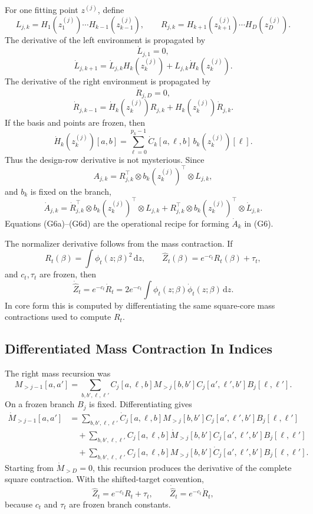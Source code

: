 \documentclass[11pt]{article}
\newcommand{\dd}{\,\mathrm d}
\begin{document}
For one fitting point \(z^{(j)}\), define
\[
    L_{j,k}=H_1(z_1^{(j)})\cdots H_{k-1}(z_{k-1}^{(j)}),
    \qquad
    R_{j,k}=H_{k+1}(z_{k+1}^{(j)})\cdots H_D(z_D^{(j)}).
\]
The derivative of the left environment is propagated by
\[
    \dot L_{j,1}=0,
\]
\[
    \dot L_{j,k+1}
    =
    \dot L_{j,k}H_k(z_k^{(j)})
    +
    L_{j,k}\dot H_k(z_k^{(j)}).
    \tag{G6a}
\]
The derivative of the right environment is propagated by
\[
    \dot R_{j,D}=0,
\]
\[
    \dot R_{j,k-1}
    =
    \dot H_k(z_k^{(j)})R_{j,k}
    +
    H_k(z_k^{(j)})\dot R_{j,k}.
    \tag{G6b}
\]
If the basis and points are frozen, then
\[
    \dot H_k(z_k^{(j)})[a,b]
    =
    \sum_{\ell=0}^{p_k-1}
    \dot C_k[a,\ell,b]\,b_k(z_k^{(j)})[\ell].
    \tag{G6c}
\]
Thus the design-row derivative is not mysterious.  Since
\[
    A_{j,k}=R_{j,k}^\top\otimes b_k(z_k^{(j)})^\top\otimes L_{j,k},
\]
and \(b_k\) is fixed on the branch,
\[
    \dot A_{j,k}
    =
    \dot R_{j,k}^{\top}\otimes b_k(z_k^{(j)})^\top\otimes L_{j,k}
    +
    R_{j,k}^{\top}\otimes b_k(z_k^{(j)})^\top\otimes \dot L_{j,k}.
    \tag{G6d}
\]
Equations (G6a)--(G6d) are the operational recipe for forming
\(\dot A_k\) in (G6).

The normalizer derivative follows from the mass contraction.  If
\[
    R_t(\beta)=\int \phi_t(z;\beta)^2\dd z,
    \qquad
    \widehat Z_t(\beta)=e^{-c_t}R_t(\beta)+\tau_t,
\]
and \(c_t,\tau_t\) are frozen, then
\[
    \dot{\widehat Z}_t=e^{-c_t}\dot R_t
    =
    2e^{-c_t}\int \phi_t(z;\beta)\dot\phi_t(z;\beta)\dd z.
    \tag{G7}
\]
In core form this is computed by differentiating the same square-core mass
contractions used to compute \(R_t\).

\subsection{Differentiated Mass Contraction In Indices}

The right mass recursion was
\[
    M_{>j-1}[a,a']
    =
    \sum_{b,b',\ell,\ell'}
    C_j[a,\ell,b]M_{>j}[b,b']C_j[a',\ell',b']B_j[\ell,\ell'].
\]
On a frozen branch \(B_j\) is fixed.  Differentiating gives
\[
\begin{aligned}
 \dot M_{>j-1}[a,a']
 &=
 \sum_{b,b',\ell,\ell'}
 \dot C_j[a,\ell,b]M_{>j}[b,b']C_j[a',\ell',b']B_j[\ell,\ell']\\
 &\quad+
 \sum_{b,b',\ell,\ell'}
 C_j[a,\ell,b]\dot M_{>j}[b,b']C_j[a',\ell',b']B_j[\ell,\ell']\\
 &\quad+
 \sum_{b,b',\ell,\ell'}
 C_j[a,\ell,b]M_{>j}[b,b']\dot C_j[a',\ell',b']B_j[\ell,\ell'].
\end{aligned}
\tag{G7a}
\]
Starting from \(\dot M_{>D}=0\), this recursion produces the derivative of the
complete square contraction.  With the shifted-target convention,
\[
    \widehat Z_t=e^{-c_t}R_t+\tau_t,
    \qquad
    \dot{\widehat Z}_t=e^{-c_t}\dot R_t,
    \tag{G7b}
\]
because \(c_t\) and \(\tau_t\) are frozen branch constants.
\end{document}
